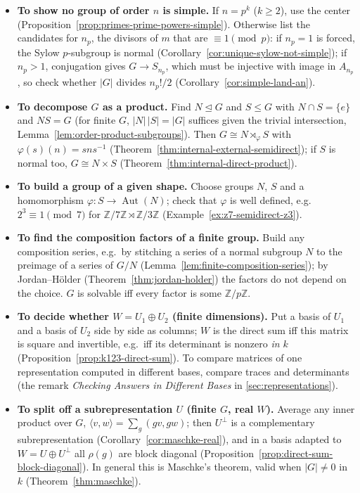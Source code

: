 \documentclass[11pt]{report}
\begin{document}
\begin{itemize}
    \item \textbf{To show no group of order $n$ is simple.} If $n = p^k$ ($k \geq 2$), use the center (Proposition~\ref{prop:primes-prime-powers-simple}). Otherwise list the candidates for $n_p$, the divisors of $m$ that are $\equiv 1 \pmod p$: if $n_p = 1$ is forced, the Sylow $p$-subgroup is normal (Corollary~\ref{cor:unique-sylow-not-simple}); if $n_p > 1$, conjugation gives $G \to S_{n_p}$, which must be injective with image in $A_{n_p}$, so check whether $|G|$ divides $n_p!/2$ (Corollary~\ref{cor:simple-land-an}).
    \item \textbf{To decompose $G$ as a product.} Find $N \trianglelefteq G$ and $S \leq G$ with $N \cap S = \{e\}$ and $NS = G$ (for finite $G$, $|N|\,|S| = |G|$ suffices given the trivial intersection, Lemma~\ref{lem:order-product-subgroups}). Then $G \cong N \rtimes_\varphi S$ with $\varphi(s)(n) = sns^{-1}$ (Theorem~\ref{thm:internal-external-semidirect}); if $S$ is normal too, $G \cong N \times S$ (Theorem~\ref{thm:internal-direct-product}).
    \item \textbf{To build a group of a given shape.} Choose groups $N$, $S$ and a homomorphism $\varphi: S \to \operatorname{Aut}(N)$; check that $\varphi$ is well defined, e.g.\ $2^3 \equiv 1 \pmod 7$ for $\mathbb{Z}/7\mathbb{Z} \rtimes \mathbb{Z}/3\mathbb{Z}$ (Example~\ref{ex:z7-semidirect-z3}).
    \item \textbf{To find the composition factors of a finite group.} Build any composition series, e.g.\ by stitching a series of a normal subgroup $N$ to the preimage of a series of $G/N$ (Lemma~\ref{lem:finite-composition-series}); by Jordan--H\"older (Theorem~\ref{thm:jordan-holder}) the factors do not depend on the choice. $G$ is solvable iff every factor is some $\mathbb{Z}/p\mathbb{Z}$.
    \item \textbf{To decide whether $W = U_1 \oplus U_2$ (finite dimensions).} Put a basis of $U_1$ and a basis of $U_2$ side by side as columns; $W$ is the direct sum iff this matrix is square and invertible, e.g.\ iff its determinant is nonzero \emph{in $k$} (Proposition~\ref{prop:k123-direct-sum}). To compare matrices of one representation computed in different bases, compare traces and determinants (the remark \emph{Checking Answers in Different Bases} in \ref{sec:representations}).
    \item \textbf{To split off a subrepresentation $U$ (finite $G$, real $W$).} Average any inner product over $G$, $\langle v, w \rangle = \sum_g (gv, gw)$; then $U^\perp$ is a complementary subrepresentation (Corollary~\ref{cor:maschke-real}), and in a basis adapted to $W = U \oplus U^\perp$ all $\rho(g)$ are block diagonal (Proposition~\ref{prop:direct-sum-block-diagonal}). In general this is Maschke's theorem, valid when $|G| \neq 0$ in $k$ (Theorem~\ref{thm:maschke}).

\end{itemize}
\end{document}
